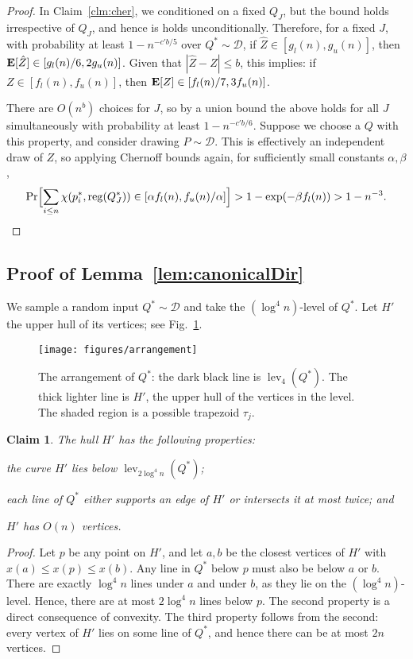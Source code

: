 \documentclass[letterpaper,11pt]{article}
\newtheorem{claim}[theorem]{Claim}
\newcommand{\EX}{\hbox{\bf E}}
\DeclareMathOperator{\reg}{reg}
\DeclareMathOperator{\lev}{lev}
\newcommand{\cD}{\mathcal{D}}
\begin{document}
\begin{proof}
In Claim~\ref{clm:cher},
we conditioned on a fixed $Q_J$, 
but the bound holds irrespective 
of $Q_J$, and hence is
holds unconditionally. 
Therefore, for a fixed $J$, 
with probability at least 
$1 - n^{-c'b/5}$ over $Q^* \sim \cD$, if 
$\hat{Z} \in [g_l(n), g_u(n)]$, then 
$\EX[\hat{Z}] \in [g_l(n)/6, 2g_u(n)]$.
Given that $|\hat{Z} - Z| \leq b$, this 
implies: 
if ${Z} \in [f_l(n), f_u(n)]$,  then
$\EX[Z] \in [f_l(n)/7, 3f_u(n)]$.

There are $O(n^b)$ choices for $J$, 
so by a union bound 
the above holds for all $J$ simultaneously
with probability at least $1 - n^{-c'b/6}$. 
Suppose we choose a $Q$ with this property,
and consider drawing $P \sim \cD$. 
This is effectively an independent draw of $Z$,
so applying Chernoff bounds again, 
for sufficiently small constants 
$\alpha, \beta$,
\[
  \Pr\Bigl[\sum_{i \leq n} \chi(p^*_i,\reg(Q^*_{J})) 
    \in [\alpha f_l(n), f_u(n)/\alpha]\Bigr] > 
    1 - \exp(-\beta f_l(n)) > 1 - n^{-3}.
\]
\end{proof}

\subsection{Proof of Lemma~\ref{lem:canonicalDir}} 
\label{sec:canonicalDir}

We sample a random input $Q^* \sim \cD$
and take the $(\log^4 n)$-level 
of $Q^*$. Let $H'$
the upper hull of its vertices; 
see Fig.~\ref{fig:arrangement}.
\begin{figure}
  \centering
  \texttt{[image: figures/arrangement]}
  \caption{The arrangement of $Q^*$: the 
    dark black line is $\lev_4(Q^*)$. 
    The thick lighter line
    is $H'$, the upper hull of the vertices 
    in the level. The shaded region 
    is a possible trapezoid $\tau_j$.}
  \label{fig:arrangement}
\end{figure}
\begin{claim}\label{clm:H_properties}
  The hull $H'$ has the following properties:
  \begin{asparaenum}
    \item 
      the curve $H'$ lies below $\lev_{2\log^4 n}(Q^*)$;
     \item 
       each line of $Q^*$ either supports 
       an edge of $H'$ or intersects 
       it at most twice; and
     \item 
       $H'$ has $O(n)$ vertices.
  \end{asparaenum}
\end{claim}
\begin{proof} 
Let $p$ be any point 
on $H'$, and let $a, b$
be the closest vertices of $H'$ with
$x(a) \leq x(p) \leq x(b)$.
Any line in $Q^*$ below
$p$ must also be below $a$ or $b$. 
There are exactly $\log^4n$ lines
under $a$ and under $b$, as they lie
on the $(\log^4n)$-level. Hence,
there are at most $2\log^4n$ lines 
below $p$.  The second property 
is a direct consequence of convexity.
The third property follows from the 
second: every vertex of $H'$ lies 
on some line of $Q^*$, and hence
there can be at most $2n$ vertices.
\end{proof}
\end{document}
